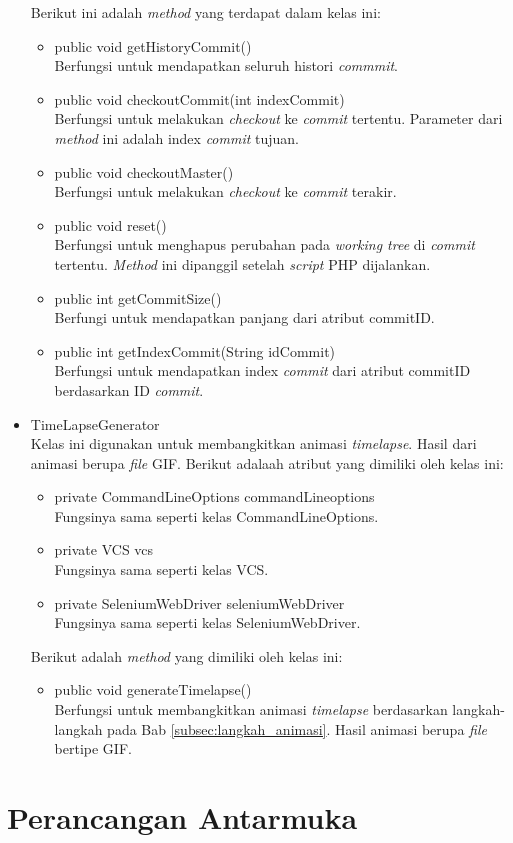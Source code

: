 \begin{itemize}
Berikut ini adalah \textit{method} yang terdapat dalam kelas ini:
\begin{itemize}
\item public void getHistoryCommit()\\
Berfungsi untuk mendapatkan seluruh histori \textit{commmit}.
\item public void checkoutCommit(int indexCommit)\\
Berfungsi untuk melakukan \textit{checkout} ke \textit{commit} tertentu. Parameter dari \textit{method} ini adalah index \textit{commit} tujuan.
\item public void checkoutMaster()\\
Berfungsi untuk melakukan \textit{checkout} ke \textit{commit} terakir.
\item public void reset()\\
Berfungsi untuk menghapus perubahan pada \textit{working tree} di \textit{commit} tertentu. \textit{Method} ini dipanggil setelah \textit{script} PHP dijalankan. 
\item public int getCommitSize()\\
Berfungi untuk mendapatkan panjang dari atribut commitID.
\item public int getIndexCommit(String idCommit)\\
Berfungsi untuk mendapatkan index \textit{commit} dari atribut commitID berdasarkan ID \textit{commit}. 
\end{itemize}


\item TimeLapseGenerator\\
Kelas ini digunakan untuk membangkitkan animasi \textit{timelapse}. Hasil dari animasi berupa \textit{file} GIF.
Berikut adalaah atribut yang dimiliki oleh kelas ini:
\begin{itemize}
\item private CommandLineOptions commandLineoptions\\
Fungsinya sama seperti kelas CommandLineOptions.
\item private VCS vcs\\
Fungsinya sama seperti kelas VCS.
\item private SeleniumWebDriver seleniumWebDriver\\
Fungsinya sama seperti kelas SeleniumWebDriver.
\end{itemize}

Berikut adalah \textit{method} yang dimiliki oleh kelas ini:
\begin{itemize}
\item public void generateTimelapse()\\
Berfungsi untuk membangkitkan animasi \textit{timelapse} berdasarkan langkah-langkah pada Bab \ref{subsec:langkah_animasi}. Hasil animasi berupa \textit{file} bertipe GIF.
\end{itemize}

\end{itemize}

\section{Perancangan Antarmuka}
\label{sec:perancangan_antarmuka}